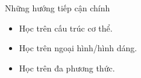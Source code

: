
\begin{frame}{Những hướng tiếp cận chính}
    \begin{itemize}
        \item Học trên cấu trúc cơ thể.
        \item Học trên ngoại hình/hình dáng.
        \item Học trên đa phương thức.
    \end{itemize}

\end{frame}


